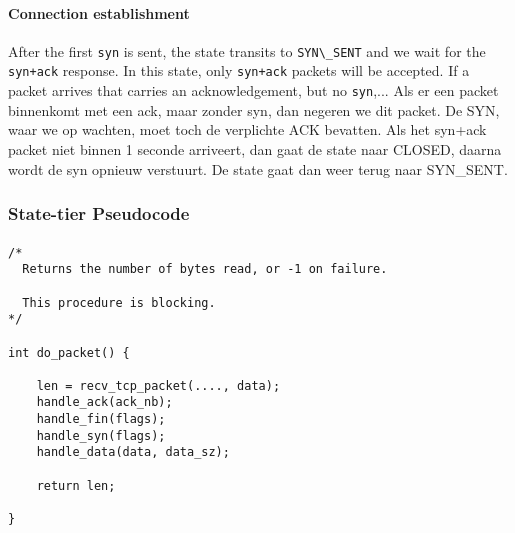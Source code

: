 \documentclass[11pt]{article}
\begin{document}
\paragraph{Connection establishment}
    After the first \verb|syn| is sent, the state transits to \verb|SYN\_SENT| 
    and we wait for the \verb|syn+ack| response. In this state, only 
    \verb|syn+ack| packets will be accepted. If a packet arrives that carries an
    acknowledgement, but no \verb|syn|,...
    Als er een packet binnenkomt met een ack, maar zonder syn, dan
    negeren we dit packet. De SYN, waar we  op wachten, moet toch de
    verplichte ACK bevatten. Als het syn+ack packet niet binnen 1 seconde
    arriveert, dan gaat de state naar CLOSED, daarna wordt de syn opnieuw
    verstuurt. De state gaat dan weer terug naar SYN_SENT.
\subsubsection{State-tier Pseudocode}


\paragraph{}


\begin{lstlisting}[title=Procedure do\_packet]
/*
  Returns the number of bytes read, or -1 on failure.

  This procedure is blocking.
*/

int do_packet() {

    len = recv_tcp_packet(...., data);
    handle_ack(ack_nb);
    handle_fin(flags);
    handle_syn(flags);
    handle_data(data, data_sz);

    return len;

}
\end{lstlisting}


\paragraph{}
\end{document}
